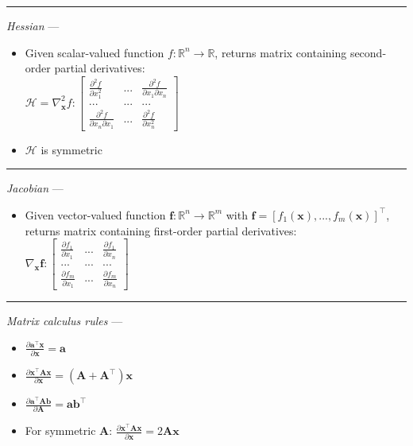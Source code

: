 {\color{lightgray}\hrule height 0.001mm}

\emph{Hessian} --- 
\begin{itemize}
    \item Given scalar-valued function $f: \mathbb{R}^{n} \rightarrow \mathbb{R}$, returns matrix containing second-order partial derivatives:\\
    $\mathcal{H} = \nabla_{\boldsymbol{x}}^2 f: \begin{bmatrix}
    \frac{\partial^2 f}{\partial x_1^2} & ... & \frac{\partial^2 f}{\partial x_1 \partial x_n} \\
    ... & ... & ... \\
    \frac{\partial^2 f}{\partial x_n \partial x_1} & ... & \frac{\partial^2 f}{\partial x_n^2}
    \end{bmatrix}$
    \item $\mathcal{H}$ is symmetric 
\end{itemize}

{\color{lightgray}\hrule height 0.001mm}

\emph{Jacobian} --- 
\begin{itemize}
    \item Given vector-valued function $\boldsymbol{f}: \mathbb{R}^{n} \rightarrow \mathbb{R}^{m}$ with $\boldsymbol{f} = [f_1(\boldsymbol{x}), ..., f_m(\boldsymbol{x})]^\intercal$, returns matrix containing first-order partial derivatives:\\
    $\nabla_{\boldsymbol{x}} \boldsymbol{f}: \begin{bmatrix}
    \frac{\partial f_1}{\partial x_1} & ... & \frac{\partial f_1}{\partial x_n} \\
    ... & ... & ... \\
    \frac{\partial f_m}{\partial x_1} & ... & \frac{\partial f_m}{\partial x_n}
    \end{bmatrix}$
\end{itemize}

{\color{lightgray}\hrule height 0.001mm}

\emph{Matrix calculus rules} --- 
\begin{multicols}{2}
\begin{itemize}
    \item $\frac{\partial \boldsymbol{a}^\intercal\boldsymbol{x}}{\partial \boldsymbol{x}} = \boldsymbol{a}$
    \item $\frac{\partial \boldsymbol{x}^\intercal\boldsymbol{A}\boldsymbol{x}}{\partial \boldsymbol{x}} = (\boldsymbol{A} + \boldsymbol{A}^\intercal)\boldsymbol{x}$
    \item $\frac{\partial \boldsymbol{a}^\intercal\boldsymbol{A}\boldsymbol{b}}{\partial \boldsymbol{A}} = \boldsymbol{a}\boldsymbol{b}^\intercal$
    \item For symmetric $\boldsymbol{A}$: $\frac{\partial \boldsymbol{x}^\intercal\boldsymbol{A}\boldsymbol{x}}{\partial \boldsymbol{x}} = 2\boldsymbol{A}\boldsymbol{x}$
\end{itemize}
\end{multicols}

